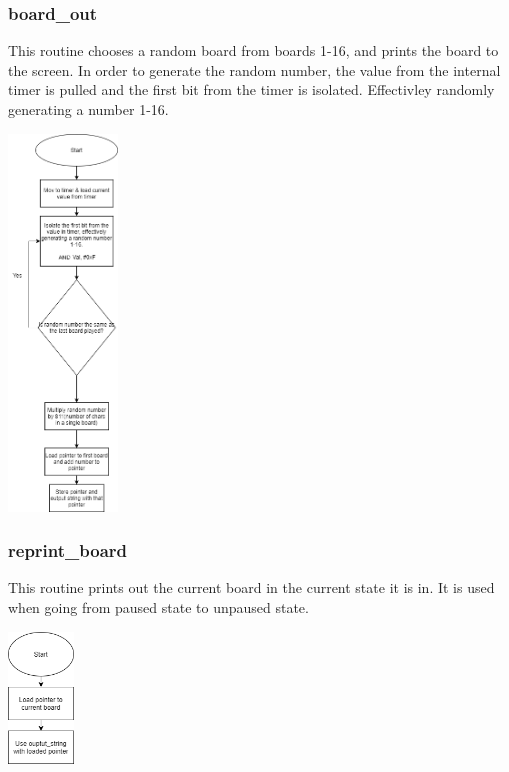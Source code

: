 \documentclass{article}
\begin{document}
    \subsubsection{board\_out}
        This routine chooses a random board from boards 1-16, and prints the board to the screen.
        In order to generate the random number, the value from the internal timer is pulled and the
        first bit from the timer is isolated. Effectivley randomly generating a number 1-16.
        \begin{center}
            {\includegraphics[height=10cm]{board_out.png}\centering} 
        \end{center}
        \newpage

    \subsubsection{reprint\_board}
        This routine prints out the current board in the current state it is in. It is used when going from
        paused state to unpaused state.
        \begin{center}
            {\includegraphics[height=3.5cm]{reprint_board.png}\centering} 
        \end{center}
\end{document}
